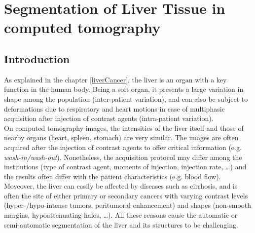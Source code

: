 

\chapter{Segmentation of Liver Tissue in computed tomography} \label{SegSemantic}

\section{Introduction}

As explained in the chapter \ref{liverCancer}, the liver is an
organ with a key function in the human body. Being a soft organ, it
presents a large variation in shape among the population (inter-patient
variation), and can also be subject to deformations due to respiratory
and heart motions in case of multiphasic acquisition after injection of
contrast agents (intra-patient variation).\\
On computed tomography images, the intensities of the liver itself and
those of nearby organs (heart, spleen, stomach) are very similar. The
images are often acquired after the injection of contrast agents to
offer critical information (e.g. \emph{wash-in/wash-out}). Nonetheless,
the acquisition protocol may differ among the institutions (type of
contrast agent, moments of injection, injection rate, \ldots{}) and the
results often differ with the patient characteristics (e.g. blood flow).
Moveover, the liver can easily be affected by diseases such as
cirrhosis, and is often the site of either primary or secondary cancers
with varying contrast levels (hyper-/hypo-intense tumors, peritumoral
enhancement) and shapes (non-smooth margins, hypoattenuating halos,
\ldots{}). All these reasons cause the automatic or semi-automatic
segmentation of the liver and its structures to be challenging.



